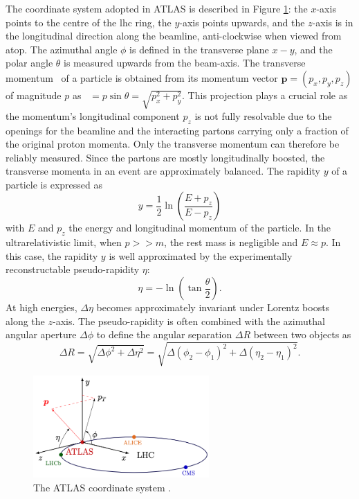 The coordinate system adopted in ATLAS is described in Figure \ref{fig-AtlasCoord}: the $x$-axis points to the centre of the \gls{lhc} ring, the $y$-axis points upwards, and the $z$-axis is in the longitudinal direction along the beamline, anti-clockwise when viewed from atop. The azimuthal angle $\phi$ is defined in the transverse plane $x-y$, and the polar angle $\theta$ is measured upwards from the beam-axis. The transverse momentum \pt\ of a particle is obtained from its momentum vector $\boldsymbol{p} = (p_x, p_y, p_z)$ of magnitude $p$ as \pt\ $=p \sin\theta = \sqrt{p_x^2 + p_y^2}$. This projection plays a crucial role as the momentum's longitudinal component $p_z$ is not fully resolvable due to the openings for the beamline and the interacting partons carrying only a fraction of the original proton momenta. Only the transverse momentum can therefore be reliably measured. Since the partons are mostly longitudinally boosted, the transverse momenta in an event are approximately balanced. The rapidity $y$ of a particle is expressed as 
\begin{equation}
  y = \frac{1}{2} \ln \left(\frac{E + p_z}{E - p_z}\right)
\end{equation}
with $E$ and $p_z$ the energy and longitudinal momentum of the particle. In the ultrarelativistic limit, when $p >> m$, the rest mass is negligible and $E \approx p$. In this case, the rapidity $y$ is well approximated by the experimentally reconstructable pseudo-rapidity $\eta$:
\begin{equation}
  \eta = -\ln \left(\tan \frac{\theta}{2}\right).
\end{equation}
At high energies, $\Delta \eta$ becomes approximately invariant under Lorentz boosts along the $z$-axis. The pseudo-rapidity is often combined with the azimuthal angular aperture $\Delta \phi$ to define the angular separation $\Delta R$ between two objects as 
\begin{equation}\label{eq-def-deltaR}
  \Delta R = \sqrt{\Delta \phi^2 + \Delta \eta^2} =  \sqrt{\Delta (\phi_2 - \phi_1)^2 + \Delta (\eta_2 - \eta_1)^2}.
\end{equation}

\begin{figure}[!h]
  \centering
  \includegraphics[width=0.6\textwidth]{Images/ATLAS/atlasCoor.png}
  \caption{The ATLAS coordinate system \cite{Strong:2020mge}.}
  \label{fig-AtlasCoord}
\end{figure}

